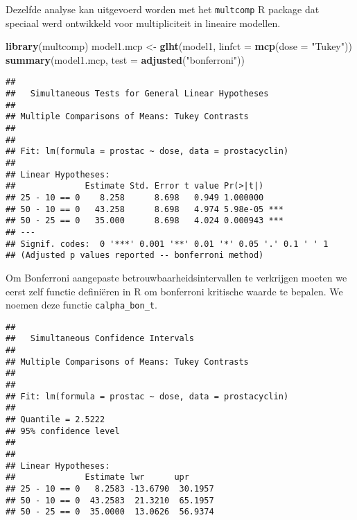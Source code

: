 \documentclass[12pt,dutch,coursenotes]{book}
\newenvironment{Shaded}{\begin{snugshade}}{\end{snugshade}}
\newcommand{\KeywordTok}[1]{\textcolor[rgb]{0.13,0.29,0.53}{\textbf{#1}}}
\newcommand{\DataTypeTok}[1]{\textcolor[rgb]{0.13,0.29,0.53}{#1}}
\newcommand{\DecValTok}[1]{\textcolor[rgb]{0.00,0.00,0.81}{#1}}
\newcommand{\StringTok}[1]{\textcolor[rgb]{0.31,0.60,0.02}{#1}}
\newcommand{\ControlFlowTok}[1]{\textcolor[rgb]{0.13,0.29,0.53}{\textbf{#1}}}
\newcommand{\OperatorTok}[1]{\textcolor[rgb]{0.81,0.36,0.00}{\textbf{#1}}}
\newcommand{\NormalTok}[1]{#1}
\theoremstyle{definition}
\theoremstyle{definition}
\theoremstyle{definition}
\theoremstyle{remark}
\begin{document}
Dezelfde analyse kan uitgevoerd worden met het \texttt{multcomp} R
package dat speciaal werd ontwikkeld voor multipliciteit in lineaire
modellen.

\begin{Shaded}
\begin{Highlighting}[]
\KeywordTok{library}\NormalTok{(multcomp)}
\NormalTok{model1.mcp <-}\StringTok{ }\KeywordTok{glht}\NormalTok{(model1, }\DataTypeTok{linfct =} \KeywordTok{mcp}\NormalTok{(}\DataTypeTok{dose =} \StringTok{"Tukey"}\NormalTok{))}
\KeywordTok{summary}\NormalTok{(model1.mcp, }\DataTypeTok{test =} \KeywordTok{adjusted}\NormalTok{(}\StringTok{"bonferroni"}\NormalTok{))}
\end{Highlighting}
\end{Shaded}

\begin{verbatim}
## 
##   Simultaneous Tests for General Linear Hypotheses
## 
## Multiple Comparisons of Means: Tukey Contrasts
## 
## 
## Fit: lm(formula = prostac ~ dose, data = prostacyclin)
## 
## Linear Hypotheses:
##              Estimate Std. Error t value Pr(>|t|)    
## 25 - 10 == 0    8.258      8.698   0.949 1.000000    
## 50 - 10 == 0   43.258      8.698   4.974 5.98e-05 ***
## 50 - 25 == 0   35.000      8.698   4.024 0.000943 ***
## ---
## Signif. codes:  0 '***' 0.001 '**' 0.01 '*' 0.05 '.' 0.1 ' ' 1
## (Adjusted p values reported -- bonferroni method)
\end{verbatim}

Om Bonferroni aangepaste betrouwbaarheidsintervallen te verkrijgen
moeten we eerst zelf functie definiëren in R om bonferroni kritische
waarde te bepalen. We noemen deze functie \texttt{calpha\_bon\_t}.

\begin{Shaded}
\end{Shaded}

\begin{verbatim}
## 
##   Simultaneous Confidence Intervals
## 
## Multiple Comparisons of Means: Tukey Contrasts
## 
## 
## Fit: lm(formula = prostac ~ dose, data = prostacyclin)
## 
## Quantile = 2.5222
## 95% confidence level
##  
## 
## Linear Hypotheses:
##              Estimate lwr      upr     
## 25 - 10 == 0   8.2583 -13.6790  30.1957
## 50 - 10 == 0  43.2583  21.3210  65.1957
## 50 - 25 == 0  35.0000  13.0626  56.9374
\end{verbatim}
\end{document}
